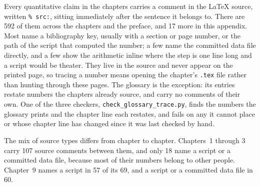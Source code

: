 Every quantitative
claim in the chapters carries a comment in the \LaTeX{} source, written
\texttt{\% src:}, sitting immediately after the sentence it belongs to. There
are 592 of them across the chapters and the preface, and 17 more in this
appendix. %
Most name a bibliography key, usually with a section or page
number, or the path of the script that computed the number; a few name the
committed data file directly, and a few show the arithmetic inline where the
step is one line long and a script would be theater. They live in the source
and never appear on the printed page, so tracing a number means opening the
chapter's \texttt{.tex} file rather than hunting through these pages. The
glossary is the exception: its entries restate numbers the chapters already
source, and carry no comments of their own. One of the three checkers,
\texttt{check\_glossary\_trace.py}, finds the numbers the glossary prints and
the chapter line each restates, and fails on any it cannot place or whose
chapter line has changed since it was last checked by hand. %

The mix of source types differs from chapter to chapter. Chapters~1 through
3 carry 107 source comments between them, and only 18 name a script or
a committed data file, because most of their numbers belong to other people.
Chapter~9 names a script in 57 of its 69, and a script or a committed data file
in 60. %

